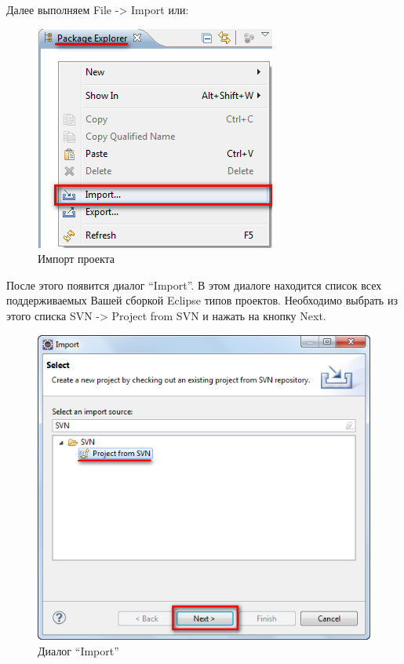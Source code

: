 \documentclass[a4paper,12pt]{article}
\begin{document}
Далее выполняем File -\textgreater{} Import или:

\begin{figure}[h!]
	\centering
	\includegraphics[scale=0.60]{eclipse-checkout-step-1.png}
	\caption{Импорт проекта}
\end{figure}

После этого появится диалог ``Import''. В этом диалоге находится список
всех поддерживаемых Вашей сборкой Eclipse типов проектов. Необходимо
выбрать из этого списка SVN -\textgreater{} Project from SVN и нажать на
кнопку Next.

\begin{figure}[h!]
	\centering
	\includegraphics[scale=0.80]{eclipse-checkout-step-2.png}
	\vspace{-10pt}
	\caption{Диалог ``Import''}
\end{figure}
\end{document}
